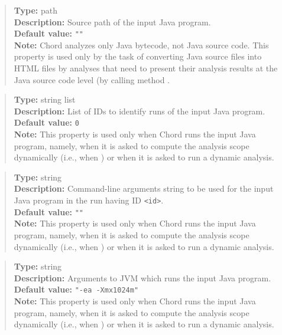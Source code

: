 \begin{quote}
{\bf Type:} path \\
{\bf Description:} Source path of the input Java program. \\
{\bf Default value:} {\tt ""} \\
{\bf Note:} Chord analyzes only Java bytecode, not Java source code.  This property is used only by the task of converting Java source files into HTML files by analyses that need to present their analysis results at the Java source code level (by calling method .
\end{quote}

\begin{quote}
{\bf Type:} string list \\
{\bf Description:} List of IDs to identify runs of the input Java program. \\
{\bf Default value:} {\tt 0} \\
{\bf Note:} This property is used only when Chord runs the input Java program, namely, when it is asked to compute the analysis scope dynamically (i.e., when ) or when it is asked to run a dynamic analysis. 
\end{quote}

\begin{quote}
{\bf Type:} string \\
{\bf Description:} Command-line arguments string to be used for the input Java program in the run having ID {\tt <id>}. \\
{\bf Default value:} {\tt ""} \\
{\bf Note:} This property is used only when Chord runs the input Java program, namely, when it is asked to compute the analysis scope dynamically (i.e., when ) or when it is asked to run a dynamic analysis.
\end{quote}

\begin{quote}
{\bf Type:} string \\
{\bf Description:} Arguments to JVM which runs the input Java program. \\
{\bf Default value:} {\tt "-ea -Xmx1024m"} \\
{\bf Note:} This property is used only when Chord runs the input Java program, namely, when it is asked to compute the analysis scope dynamically (i.e., when ) or when it is asked to run a dynamic analysis. 
\end{quote}

